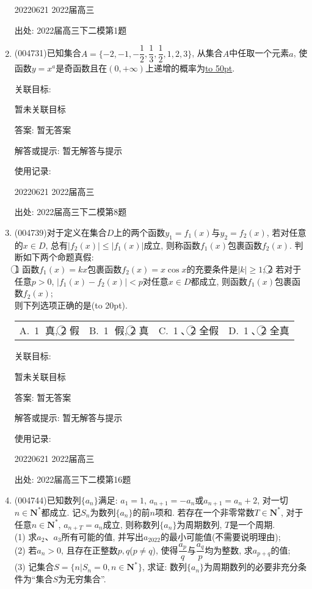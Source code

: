\documentclass[10pt,a4paper]{article}
\newcommand{\blank}[1]{\underline{\hbox to #1pt{}}}
\newcommand{\bracket}[1]{(\hbox to #1pt{})}
\newcommand{\fourch}[4]{\par\begin{tabular}{p{.23\textwidth}p{.23\textwidth}p{.23\textwidth}p{.23\textwidth}}
A.~#1 &B.~#2& C.~#3& D.~#4
\end{tabular}}
\begin{document}
\begin{enumerate}[1.]
20220621	2022届高三	


出处: 2022届高三下二模第1题
\item { (004731)}已知集合$A=\{-2,-1,-\dfrac 12,\dfrac 13,\dfrac 12,1,2,3\}$, 从集合$A$中任取一个元素$a$, 使函数$y=x^a$是奇函数且在$(0,+\infty)$上递增的概率为\blank{50}.


关联目标:

暂未关联目标

答案: 暂无答案

解答或提示: 暂无解答与提示

使用记录:

20220621	2022届高三	


出处: 2022届高三下二模第8题
\item { (004739)}对于定义在集合$D$上的两个函数$y_1=f_1(x)$与$y_2=f_2(x)$, 若对任意的$x\in D$, 总有$|f_2(x)|\le |f_1(x)|$成立, 则称函数$f_1(x)$包裹函数$f_2(x)$. 判断如下两个命题真假:\\
\textcircled{1}  函数$f_1(x)=kx$包裹函数$f_2(x)=x\cos x$的充要条件是$|k|\ge 1$;
\textcircled{2}  若对于任意$p>0$, $|f_1(x)-f_2(x)|<p$对任意$x\in D$都成立, 则函数$f_1(x)$包裹函数$f_2(x)$;\\
则下列选项正确的是\bracket{20}.
\fourch{\textcircled{1} 真, \textcircled{2} 假}{\textcircled{1} 假, \textcircled{2} 真}{\textcircled{1}、\textcircled{2} 全假}{\textcircled{1}、\textcircled{2} 全真}


关联目标:

暂未关联目标

答案: 暂无答案

解答或提示: 暂无解答与提示

使用记录:

20220621	2022届高三	


出处: 2022届高三下二模第16题
\item { (004744)}已知数列$\{a_n\}$满足: $a_1=1$, $a_{n+1}=-a_n$或$a_{n+1}=a_n+2$, 对一切$n\in \mathbf{N}^*$都成立. 记$S_n$为数列$\{a_n\}$的前$n$项和. 若存在一个非零常数$T\in \mathbf{N}^*$, 对于任意$n\in \mathbf{N}^*$, $a_{n+T}={a_n}$成立, 则称数列$\{a_n\}$为周期数列, $T$是一个周期.\\
(1) 求$a_2$、$a_3$所有可能的值, 并写出$a_{2022}$的最小可能值(不需要说明理由);\\
(2) 若$a_n>0$, 且存在正整数$p,q$($p\ne q$), 使得$\dfrac{a_p}q$与$\dfrac{a_q}p$均为整数, 求$a_{p+q}$的值;\\
(3) 记集合$S=\{n|S_n=0,n\in \mathbf{N}^*\}$, 求证: 数列$\{a_n\}$为周期数列的必要非充分条件为``集合$S$为无穷集合''.



\end{enumerate}
\end{document}
